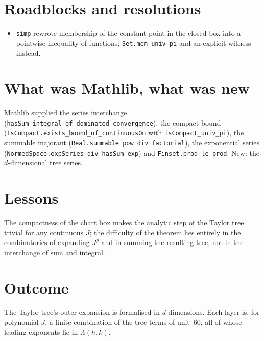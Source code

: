 \documentclass[11pt]{article}
\begin{document}
\section{Roadblocks and resolutions}
\begin{itemize}
\item \texttt{simp} rewrote membership of the constant point in the closed box into a pointwise
inequality of functions; \texttt{Set.mem\_univ\_pi} and an explicit witness instead.
\end{itemize}

\section{What was Mathlib, what was new}
Mathlib supplied the series interchange (\texttt{hasSum\_integral\_of\_dominated\_convergence}), the
compact bound (\texttt{IsCompact.exists\_bound\_of\_continuousOn} with \texttt{isCompact\_univ\_pi}),
the summable majorant (\texttt{Real.summable\_pow\_div\_factorial}), the exponential series
(\texttt{NormedSpace.expSeries\_div\_hasSum\_exp}) and \texttt{Finset.prod\_le\_prod}. New: the
$d$-dimensional tree series.

\section{Lessons}
The compactness of the chart box makes the analytic step of the Taylor tree trivial for any continuous
$J$; the difficulty of the theorem lies entirely in the combinatorics of expanding $J^p$ and in
summing the resulting tree, not in the interchange of sum and integral.

\section{Outcome}
The Taylor tree's outer expansion is formalised in $d$ dimensions. Each layer is, for polynomial $J$,
a finite combination of the tree terms of unit~60, all of whose leading exponents lie in $\Lambda(h,k)$.
\end{document}

